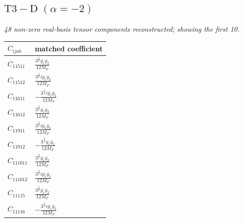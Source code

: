 \documentclass[9pt]{article}
\begin{document}
\subsection*{$ \mathrm{T3-D}\;(\alpha=-2) $}
\textit{48 non-zero real-basis tensor components reconstructed; showing the first 10.}
\begin{longtable}{@{}ll@{}}
\toprule
$C_{ijab}$ & matched coefficient \\
\midrule
$C_{11511}$ & $ \frac{3^{\frac{3}{4}} \overline{y_{1}} \overline{y_{2}}}{12 M_F} $ \\
$C_{11512}$ & $ \frac{3^{\frac{3}{4}} i \overline{y_{1}} \overline{y_{2}}}{12 M_F} $ \\
$C_{11611}$ & $ - \frac{3^{\frac{3}{4}} i \overline{y_{1}} \overline{y_{2}}}{12 M_F} $ \\
$C_{11612}$ & $ \frac{3^{\frac{3}{4}} \overline{y_{1}} \overline{y_{2}}}{12 M_F} $ \\
$C_{11911}$ & $ \frac{3^{\frac{3}{4}} i \overline{y_{1}} \overline{y_{2}}}{12 M_F} $ \\
$C_{11912}$ & $ - \frac{3^{\frac{3}{4}} \overline{y_{1}} \overline{y_{2}}}{12 M_F} $ \\
$C_{111011}$ & $ \frac{3^{\frac{3}{4}} \overline{y_{1}} \overline{y_{2}}}{12 M_F} $ \\
$C_{111012}$ & $ \frac{3^{\frac{3}{4}} i \overline{y_{1}} \overline{y_{2}}}{12 M_F} $ \\
$C_{11115}$ & $ \frac{3^{\frac{3}{4}} \overline{y_{1}} \overline{y_{2}}}{12 M_F} $ \\
$C_{11116}$ & $ - \frac{3^{\frac{3}{4}} i \overline{y_{1}} \overline{y_{2}}}{12 M_F} $ \\
\bottomrule
\end{longtable}
\end{document}

